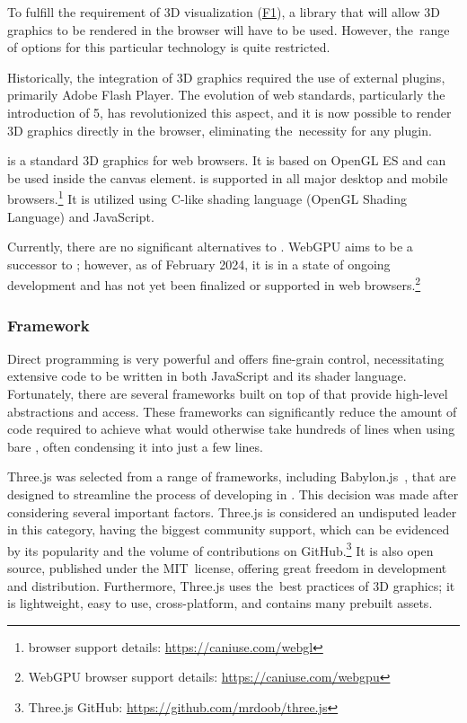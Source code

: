 To fulfill the requirement of 3D visualization (\hyperref[itm:F1]{F1}), a library that will allow 3D graphics to be rendered in the browser will have to be used. However, the~range of options for this particular technology is quite restricted.

Historically, the integration of 3D graphics required the use of external plugins, primarily Adobe Flash Player. The evolution of web standards, particularly the introduction of 5, has revolutionized this aspect, and it is now possible to render 3D graphics directly in the browser, eliminating the~necessity for any plugin.~\cite{Parisi2014}

 is a standard 3D graphics  for web browsers. It is based on OpenGL ES and can be used inside the  canvas element.  is supported in all major desktop and mobile browsers.\footnote{ browser support details: \url{https://caniuse.com/webgl}} It is utilized using C-like shading language (OpenGL Shading Language) and JavaScript.~\cite{Parisi2012}

Currently, there are no significant alternatives to . WebGPU aims to be a successor to ; however, as of February 2024, it is in a state of ongoing development and has not yet been finalized or supported in web browsers.\footnote{WebGPU browser support details: \url{https://caniuse.com/webgpu}}~\cite{WebGPU}


\subsubsection{ Framework} \label{section:WebGL}

Direct  programming is very powerful and offers fine-grain control, necessitating extensive code to be written in both JavaScript and its shader language. Fortunately, there are several frameworks built on top of  that provide high-level abstractions and access. These frameworks can significantly reduce the amount of code required to achieve what would otherwise take hundreds of lines when using bare , often condensing it into just a few lines.~\cite{Parisi2014}

Three.js was selected from a range of frameworks, including Babylon.js~\cite{BabylonJs}, that are designed to streamline the process of developing in . This decision was made after considering several important factors.
Three.js is considered an undisputed leader in this category, having the biggest community support, which can be evidenced by its popularity and the volume of contributions on GitHub.\footnote{Three.js GitHub: \url{https://github.com/mrdoob/three.js}} It is also open source, published under the MIT~license, offering great freedom in development and distribution. Furthermore, Three.js uses the~best practices of 3D graphics; it is lightweight, easy to use, cross-platform, and contains many prebuilt assets.~\cite{ThreeJs}


